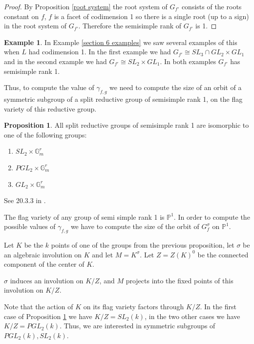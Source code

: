 \documentclass[12pt]{article}
\newcommand{\<}{\langle}
\renewcommand{\>}{\rangle}
\theoremstyle{plain}
\theoremstyle{definition}
\newtheorem{prop}[theorem]{Proposition}
\newtheorem{exmp}[theorem]{Example} %
\begin{document}
\begin{proof}
    By Proposition \ref{root system} the root system of $G_{f'}$ consists of the roots constant on $f$, $f$ is a facet of codimension 1 so there is a single root (up to a sign) in the root system of $G_{f'}$. Therefore the semisimple rank of $G_{f'}$ is 1. 
\end{proof}

\begin{exmp}
    In Example \ref{section 6 examples} we saw several examples of this when $L$ had codimension 1. In the first example we had $G_{f'}\cong SL_3\cap GL_2\times GL_1$ and in the second example we had $G_{f'}\cong SL_2\times GL_1$. In both examples $G_{f'}$ has semisimple rank 1.
\end{exmp}

Thus, to compute the value of $\gamma_{f,g}$ we need to compute the size of an orbit of a symmetric subgroup of a split reductive group of semisimple rank 1, on the flag variety of this reductive group.

\begin{prop}\label{rank1 groups}
    All split reductive groups of semisimple rank 1 are isomorphic to one of the following groups:
    \begin{enumerate}
        \item $SL_2\times\mathbb{G}^r_m$
        \item $PGL_2\times\mathbb{G}^r_m$
        \item $GL_2\times\mathbb{G}^r_m$
    \end{enumerate}

    See 20.3.3 in \cite{Milne_2017}.
\end{prop}

The flag variety of any group of semi simple rank 1 is $\mathbb{P}^1$. In order to compute the possible values of $\gamma_{f,g}$ we have to compute the size of the orbit of $G^\sigma_f$ on $\mathbb{P}^1$.

Let $K$ be the $k$ points of one of the groups from the previous proposition, let $\sigma$ be an algebraic involution on $K$ and let $M=K^\sigma$. Let $Z=Z(K)^0$ be the connected component of the center of $K$.

$\sigma$ induces an involution on $K/Z$, and $M$ projects into the fixed points of this involution on $K/Z$. 

Note that the action of $K$ on its flag variety factors through $K/Z$. In the first case of Proposition \ref{rank1 groups} we have $K/Z=SL_2(k)$, in the two other cases we have $K/Z=PGL_2(k)$. Thus, we are interested in symmetric subgroups of $PGL_2(k),SL_2(k)$.
\end{document}
